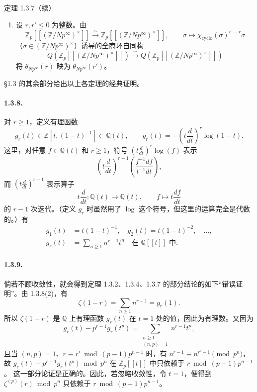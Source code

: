 \begin{statement}{定理 1.3.7（续）}
\begin{enumerate}[label=(\arabic*),start=2]
\item 设 $r,r'\leq0$ 为整数。由
\[
\mathbb Z_p[[(\mathbb Z/Np^\infty)^\times]]
\xrightarrow{\sim}\mathbb Z_p[[(\mathbb Z/Np^\infty)^\times]],
\qquad\sigma\longmapsto\chi_{\mathrm{cyclo}}(\sigma)^{r'-r}\sigma
\]
（$\sigma\in(\mathbb Z/Np^\infty)^\times$）诱导的全商环自同构
\[
Q(\mathbb Z_p[[(\mathbb Z/Np^\infty)^\times]])
\xrightarrow{\sim}Q(\mathbb Z_p[[(\mathbb Z/Np^\infty)^\times]])
\]
将 $\theta_{Np^\infty}(r)$ 映为 $\theta_{Np^\infty}(r')$。
\end{enumerate}
\end{statement}
§1.3 的其余部分给出以上各定理的经典证明。

\paragraph{1.3.8.}
对 $r\geq1$，定义有理函数
\[
g_r(t)\in\mathbb Z[t,(1-t)^{-1}]\subset\mathbb Q(t),
\qquad g_r(t)=-\left(t\frac d{dt}\right)^r\log(1-t).
\]
这里，对任意 $f\in\mathbb Q(t)$ 和 $r\geq1$，符号
$\left(t\frac d{dt}\right)^r\log(f)$ 表示
\[
\left(t\frac d{dt}\right)^{r-1}\left(\frac{f^{-1}df}{t^{-1}dt}\right),
\]
而 $\left(t\frac d{dt}\right)^{r-1}$ 表示算子
\[
t\frac d{dt}\colon\mathbb Q(t)\longrightarrow\mathbb Q(t),
\qquad f\longmapsto t\frac{df}{dt}
\]
的 $r-1$ 次迭代。（定义 $g_r$ 时虽然用了 $\log$ 这个符号，但这里的运算完全是代数的。）有
\begin{align*}
g_1(t)&=t(1-t)^{-1},\quad g_2(t)=t(1-t)^{-2},\quad\ldots,\tag{1}\\
g_r(t)&=\sum_{n\geq1}n^{r-1}t^n\quad\text{在 $\mathbb Q[[t]]$ 中}.\tag{2}
\end{align*}

\paragraph{1.3.9.}
倘若不顾收敛性，就会得到定理 1.3.2、1.3.4、1.3.7 的部分结论的如下“错误证明”。由 1.3.8(2)，有
\[
\zeta(1-r)=\sum_{n\geq1}n^{r-1}=g_r(1).\tag{*}
\]
所以 $\zeta(1-r)$ 是 $\mathbb Q$ 上有理函数 $g_r(t)$ 在 $t=1$ 处的值，因此为有理数。又因为
\[
g_r(t)-p^{r-1}g_r(t^p)=\sum_{\substack{n\geq1\\(n,p)=1}}n^{r-1}t^n,
\]
且当 $(n,p)=1$、$r\equiv r'\bmod(p-1)p^{n-1}$ 时，有
$n^{r-1}\equiv n^{r'-1}\pmod{p^n}$，故
$g_r(t)-p^{r-1}g_r(t^p)\bmod p^n$ 在 $\mathbb Z_p[[t]]$ 中只依赖于
$r\bmod(p-1)p^{n-1}$。
这一部分论证是正确的。因此，若忽略收敛性，令 $t=1$，便得到
$\zeta^{(p)}(r)\bmod p^n$ 只依赖于 $r\bmod(p-1)p^{n-1}$。

